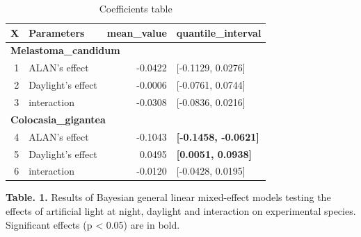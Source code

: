 \documentclass[
  12pt,
  letterpaper,
  DIV=11,
  numbers=noendperiod]{scrartcl}
\begin{document}
\newpage

\begin{table}

\caption{Coefficients table}
\centering
\begin{tabular}[t]{r|l|r|>{}l}
\hline
X & Parameters & mean\_value & quantile\_interval\\
\hline
\multicolumn{4}{l}{\textbf{Melastoma\_candidum}}\\
\hline
\hspace{1em}1 & ALAN's effect & -0.0422 & [-0.1129, 0.0276]\\
\hline
\hspace{1em}2 & Daylight's effect & -0.0006 & [-0.0761, 0.0744]\\
\hline
\hspace{1em}3 & interaction & -0.0308 & [-0.0836, 0.0216]\\
\hline
\multicolumn{4}{l}{\textbf{Colocasia\_gigantea}}\\
\hline
\hspace{1em}4 & ALAN's effect & -0.1043 & \textbf{[-0.1458, -0.0621]}\\
\hline
\hspace{1em}5 & Daylight's effect & 0.0495 & \textbf{[0.0051, 0.0938]}\\
\hline
\hspace{1em}6 & interaction & -0.0120 & [-0.0428, 0.0195]\\
\hline
\end{tabular}
\end{table}

\textbf{Table. 1.} Results of Bayesian general linear mixed-effect
models testing the effects of artificial light at night, daylight and
interaction on experimental species. Significant effects (p \textless{}
0.05) are in bold.

\newpage
\end{document}
